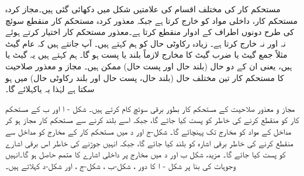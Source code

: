 مستحکم کار کی مختلف اقسام کی علامتیں شکل میں دکھائی گئی ہیں۔مجاز کردہ مستحکم کار، داخلی مواد کو خارج کرتا ہے جبکہ معذور کردہ مستحکم کار منقطع سوئچ کی طرح دونوں اطراف کے ادوار منقطع کرتا ہے۔معذور مستحکم کار  اختیار کرتے ہوئے نہ  اور نہ  خارج کرتا ہے۔  زیادہ رکاوٹی حال کو ہم  کہتے ہیں۔ آپ جانتے ہیں کہ عام گیٹ مثلاً جمع گیٹ یا ضرب گیٹ کا مخارج لازماً بلند یا پست ہو گا۔ ہم کہتے ہیں یہ گیٹ  یا  ہیں، یعنی ان کے دو حال (بلند حال اور پست حال)  ممکن ہیں۔   مجاز و معذور صلاحیت کا مستحکم کار تین مختلف حال (بلند حال، پست حال اور بلند رکاوٹی حال)  میں ہو سکتا ہے لہٰذا یہ   یاکہلائے گا۔


مجاز و معذور صلاحیت کے مستحکم کار بطور برقی سوئچ کام کرتے ہیں۔ شکل - ا اور ب کے مستحکم کار کو منقطع کرنے کی خاطر  کو پست کیا جائے گا، جبکہ اسے بلند کرنے سے مستحکم کار مجاز ہو کر مداخل کے مواد کو مخارج تک پہنچائے گا۔ شکل-ج اور د میں مستحکم کار کے مخارج کو مداخل سے منقطع کرنے کی خاطر  برقی اشارہ کو بلند کیا جائے گا، جبکہ انہیں جوڑنے کی خاطر اس برقی اشارے کو پست کیا جائے گا۔ مزید، شکل ب اور د میں مخارج پر داخلی اشارے کا متمم حاصل ہو گا۔انہیں وجوہات کی بنا پر شکل - ا کا دور ، شکل-ب ، شکل-ج ، اور شکل-د  کہلاتے ہیں۔
 

